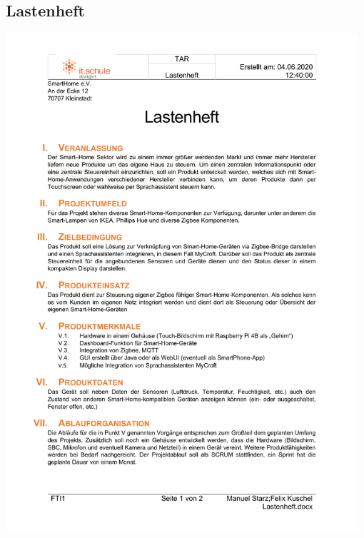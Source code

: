 \documentclass[12pt,a4paper]{article}
\begin{document}
 	\subsection{Lastenheft}
 	\includegraphics[width=0.98\textwidth, page=1]{lastenheft.pdf}
 	\newpage
\end{document}
